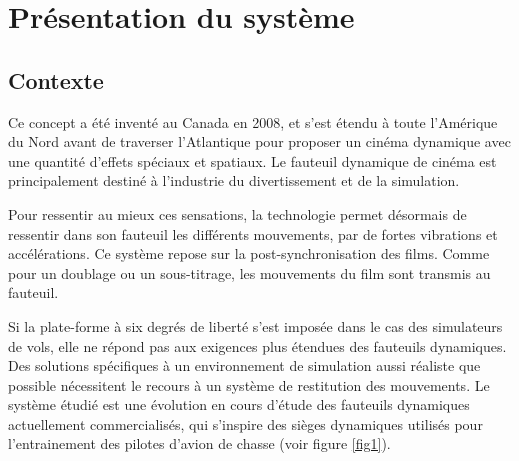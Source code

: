 

\section{Présentation du système}

\subsection{Contexte}

Ce concept a été inventé au Canada en 2008, et s'est étendu à toute l'Amérique du Nord avant de traverser l'Atlantique pour proposer un cinéma dynamique avec une quantité d'effets spéciaux et spatiaux. Le fauteuil dynamique de cinéma est principalement destiné à l'industrie du divertissement et de la simulation.

Pour ressentir au mieux ces sensations, la technologie permet désormais de ressentir dans son fauteuil les différents mouvements, par de fortes vibrations et accélérations. Ce système repose sur la post-synchronisation des films. Comme pour un doublage ou un sous-titrage, les mouvements du film sont transmis au fauteuil.

Si la plate-forme à six degrés de liberté s'est imposée dans le cas des simulateurs de vols, elle ne répond pas aux exigences plus étendues des fauteuils dynamiques. Des solutions spécifiques à un environnement de simulation aussi réaliste que possible nécessitent le recours à un système de restitution des mouvements. Le système étudié est une évolution en cours d'étude des fauteuils dynamiques actuellement commercialisés, qui s'inspire des sièges dynamiques utilisés pour l'entrainement des pilotes d'avion de chasse (voir figure \ref{fig1}).

